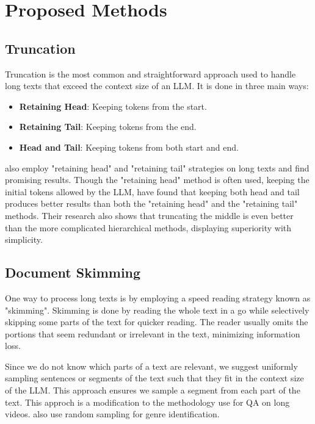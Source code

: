 \section{Proposed Methods}


\subsection{Truncation}
\label{method:truncation}

Truncation is the most common and straightforward approach used to handle long texts
that exceed the context size of an LLM.
It is done in three main ways:

\begin{itemize}
	\item \textbf{Retaining Head}: Keeping tokens from the start.
	\item \textbf{Retaining Tail}: Keeping tokens from the end.
	\item \textbf{Head and Tail}: Keeping tokens from both start and end.
\end{itemize}

\citet{worsham-kalita-2018-genre} also employ "retaining head" and "retaining tail"
strategies on long texts and find promising results.
Though the "retaining head" method is often used, keeping the initial tokens allowed
by the LLM, \citet{sun2019fine} have found that keeping both head and tail produces
better results than both the "retaining head" and the "retaining tail" methods.
Their research also shows that truncating the middle is even better than the more
complicated hierarchical methods, displaying superiority with simplicity.


\subsection{Document Skimming}
\label{method:skimming}

One way to process long texts is by employing a speed reading strategy known as
"skimming".
Skimming is done by reading the whole text in a go while selectively skipping some
parts of the text for quicker reading.
The reader usually omits the portions that seem redundant or irrelevant in the text,
minimizing information loss.

Since we do not know which parts of a text are relevant, we suggest uniformly sampling
sentences or segments of the text such that they fit in the context size of the LLM.
This approach ensures we sample a segment from each part of the text.
This approch is a modification to the methodology \citet{wang2024videoagent} use for
QA on long videos. \citet{worsham-kalita-2018-genre} also use random sampling for genre
identification.


